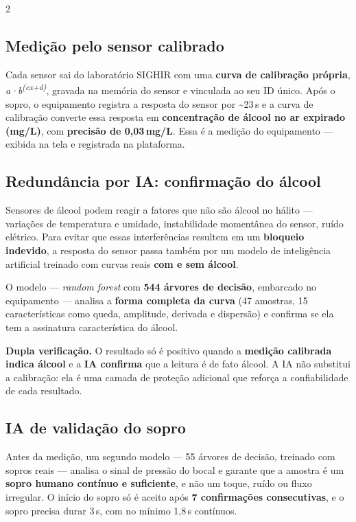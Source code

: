 \documentclass[a4paper,10pt]{article}
\begin{document}
\begin{multicols}{2}
\subsection{Medição pelo sensor calibrado}
Cada sensor sai do laboratório SIGHIR com uma \textbf{curva de calibração própria},
\emph{a·b\textsuperscript{(cx+d)}}, gravada na memória do sensor e vinculada ao seu ID único.
Após o sopro, o equipamento registra a resposta do sensor por \textasciitilde23\,s e a curva de
calibração converte essa resposta em \textbf{concentração de álcool no ar expirado (mg/L)}, com
\textbf{precisão de 0,03\,mg/L}. Essa é a medição do equipamento — exibida na tela e registrada
na plataforma.

\subsection{Redundância por IA: confirmação do álcool}
Sensores de álcool podem reagir a fatores que não são álcool no hálito — variações de
temperatura e umidade, instabilidade momentânea do sensor, ruído elétrico. Para evitar que
essas interferências resultem em um \textbf{bloqueio indevido}, a resposta do sensor passa
também por um modelo de inteligência artificial treinado com curvas reais \textbf{com e sem
álcool}.

O modelo — \emph{random forest} com \textbf{544 árvores de decisão}, embarcado no equipamento —
analisa a \textbf{forma completa da curva} (47 amostras, 15 características como queda,
amplitude, derivada e dispersão) e confirma se ela tem a assinatura característica do álcool.

\begin{nota}
\textbf{Dupla verificação.} O resultado só é positivo quando a \textbf{medição calibrada indica
álcool} e a \textbf{IA confirma} que a leitura é de fato álcool. A IA não substitui a calibração:
ela é uma camada de proteção adicional que reforça a confiabilidade de cada resultado.
\end{nota}

\columnbreak
\subsection{IA de validação do sopro}
Antes da medição, um segundo modelo — 55 árvores de decisão, treinado com sopros reais — analisa
o sinal de pressão do bocal e garante que a amostra é um \textbf{sopro humano contínuo e
suficiente}, e não um toque, ruído ou fluxo irregular. O início do sopro só é aceito após
\textbf{7 confirmações consecutivas}, e o sopro precisa durar 3\,s, com no mínimo 1,8\,s
contínuos.


\end{multicols}
\end{document}
